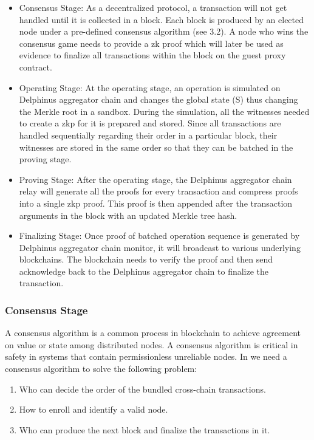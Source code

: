 \documentclass[pageno]{jpaper}
\begin{document}
\begin{itemize}[leftmargin=*]
\item Consensus Stage: As a decentralized protocol, a transaction will not get handled until it is collected in a block. Each block is produced by an elected node under a pre-defined consensus algorithm (see 3.2). A node who wins the consensus game needs to provide a zk proof which will later be used as evidence to finalize all transactions within the block on the guest proxy contract.

\item Operating Stage: At the operating stage, an operation is simulated on Delphinus aggregator chain and changes the global state (S) thus changing the Merkle root in a sandbox. During the simulation, all the witnesses needed to create a zkp for it is prepared and stored. Since all transactions are handled sequentially regarding their order in a particular block, their witnesses are stored in the same order so that they can be batched in the proving stage. 

\item Proving Stage: After the operating stage, the Delphinus aggregator chain relay will generate all the proofs for every transaction and compress proofs into a single zkp proof. This proof is then appended after the transaction arguments in the block with an updated Merkle tree hash. 
\item Finalizing Stage: Once proof of batched operation sequence is generated by Delphinus aggregator chain monitor, it will broadcast to various underlying blockchains. The blockchain needs to verify the proof and then send acknowledge back to the Delphinus aggregator chain to finalize the transaction.
\end{itemize}


\subsubsection{Consensus Stage}
\label{consensus-stage}
A consensus algorithm is a common process in blockchain to achieve agreement on value or state among distributed nodes. A consensus algorithm is critical in safety in systems that contain permissionless unreliable nodes. In \dprotocol we need a consensus algorithm to solve the following problem:

\begin{enumerate}[leftmargin=*]
\item Who can decide the order of the bundled cross-chain transactions.
\item How to enroll and identify a valid node.
\item Who can produce the next block and finalize the transactions in it. 
\end{enumerate}
\end{document}
